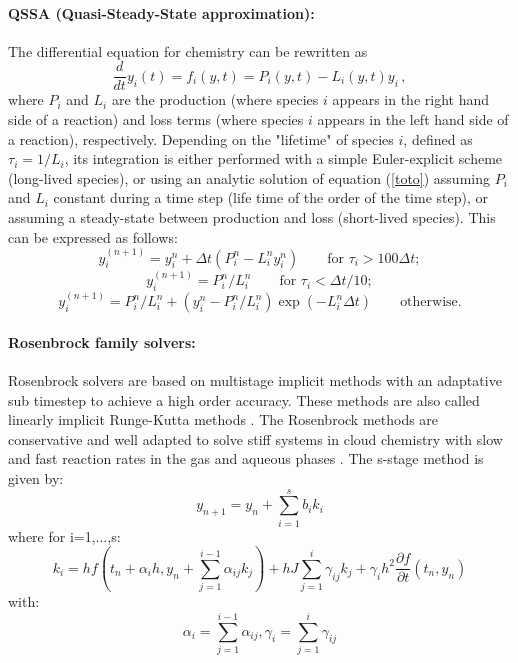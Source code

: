 \paragraph*{QSSA (Quasi-Steady-State approximation):} \citet{Hesstvedt1978}
\par\noindent
The differential equation for chemistry can be rewritten as
\begin{equation}
  \frac{d}{dt} y_i(t) = f_i (y,t) = P_i(y,t) - L_i(y,t) y_i
  \,,
  \label{toto}
\end{equation}
where $P_i$ and $L_i$ are the production 
(where species $i$ appears in the right hand side of a reaction)
and loss terms (where species $i$ appears in the left 
hand side of a reaction), respectively.
Depending on the "lifetime" of species $i$, defined as
$\tau_i = 1/L_i$, its integration is either performed with a
simple Euler-explicit scheme (long-lived species), or
using an analytic solution of equation (\ref{toto}) assuming
$P_i$ and $L_i$ constant during a time step (life time of the order of the
time step), or assuming a steady-state between production and loss
(short-lived species). This can be expressed as follows:
\begin{equation}
  y_i^{(n+1)} = y_i^n + \Delta t ( P_i^n - L_i^n y_i^n ) \qquad \mbox{for }
  \tau_i > 100 \Delta t;
\end{equation}
\begin{equation}
  y_i^{(n+1)} = P_i^n / L_i^n \qquad \mbox{for }
  \tau_i < \Delta t / 10;
\end{equation}
\begin{equation}
  y_i^{(n+1)} = P_i^n / L_i^n +(y_i^n- P_i^n / L_i^n) \exp(-L_i^n\Delta t)
  \qquad \mbox{otherwise.}
\end{equation}

\paragraph*{Rosenbrock family solvers:} \citet{Sandu2006}
\par\noindent
Rosenbrock solvers are based on multistage implicit methods with an
adaptative sub timestep to achieve a high order accuracy. These methods
are also called linearly implicit Runge-Kutta methods \citep{Durran2010}.
The Rosenbrock methods are conservative and well adapted to solve
stiff systems in cloud chemistry with slow and fast reaction rates in
the gas and aqueous phases \citep{Djouad2002}.
The s-stage method is given by:
\begin{equation}
  y_{n+1}= y_{n}+\sum_{i=1}^{s}b_{i}k_{i}
\end{equation}
where for i=1,...,s:
\begin{equation}
  k_{i}=hf\left ( t_{n}+\alpha _{i}h,y_{n}+\sum_{j=1}^{i-1}\alpha _{ij}k_{j} \right )+hJ\sum_{j=1}^{i}\gamma _{ij}k_{j}+\gamma _{i}h^{2}\frac{\partial f}{\partial t}\left ( t_{n},y_{n} \right )
\end{equation}
with:
\begin{equation}
  \alpha _{i}=\sum_{j=1}^{i-1}\alpha _{ij},  \gamma _{i}=\sum_{j=1}^{i}\gamma _{ij}
\end{equation}

